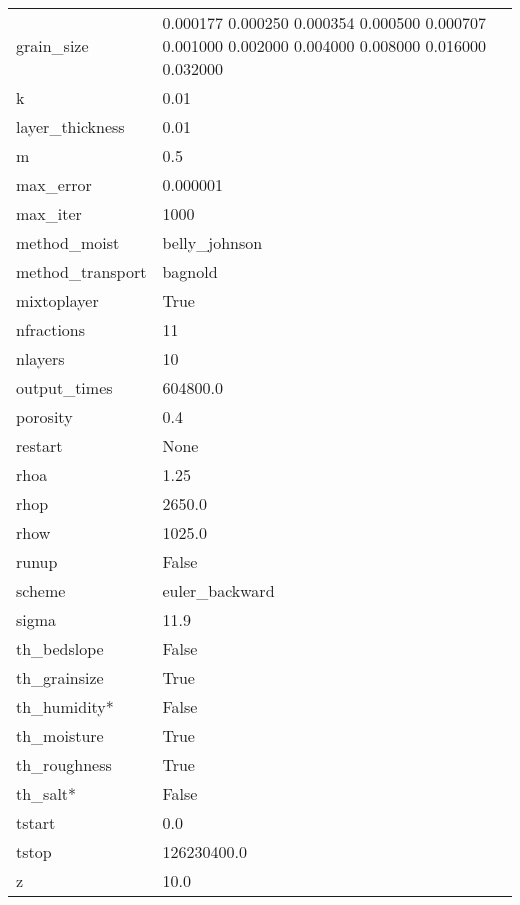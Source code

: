 \begin{longtable}{p{3cm} p{8cm}}
  grain\_size       & 0.000177 0.000250 0.000354 0.000500 0.000707 0.001000 0.002000 0.004000 0.008000 0.016000 0.032000 \\
  k                 & 0.01 \\
  layer\_thickness  & 0.01 \\
  m                 & 0.5 \\
  max\_error         & 0.000001 \\
  max\_iter          & 1000 \\
  method\_moist      & belly\_johnson \\
  method\_transport  & bagnold \\
  mixtoplayer       & True \\
  nfractions        & 11 \\
  nlayers           & 10 \\
  output\_times     & 604800.0 \\
  porosity          & 0.4 \\
  restart           & None \\
  rhoa              & 1.25 \\
  rhop              & 2650.0 \\
  rhow              & 1025.0 \\
  runup             & False \\
  scheme            & euler\_backward \\
  sigma             & 11.9 \\
  th\_bedslope      & False \\
  th\_grainsize     & True \\
  th\_humidity*     & False \\
  th\_moisture      & True \\
  th\_roughness     & True \\
  th\_salt*         & False \\
  tstart            & 0.0 \\
  tstop             & 126230400.0 \\
  z                 & 10.0 \\
  \hline
\end{longtable}


